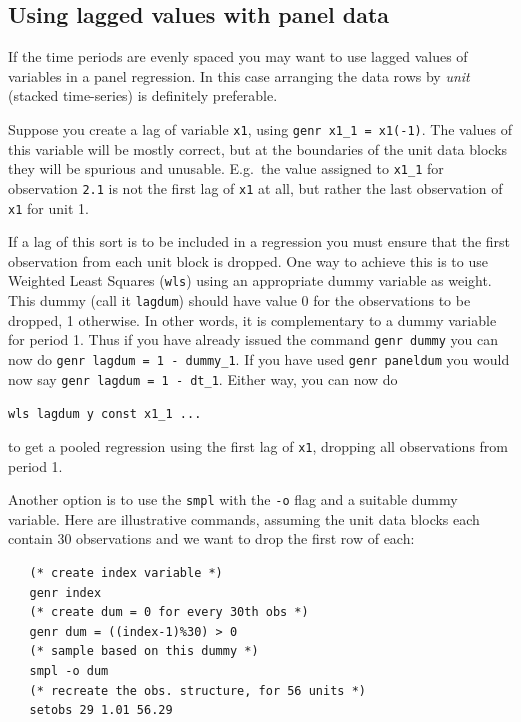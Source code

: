 \documentclass{article}
\begin{document}
\subsection{Using lagged values with panel data}

If the time periods are evenly spaced you may want to use lagged
values of variables in a panel regression.  In this case arranging the
data rows by \textit{unit} (stacked time-series) is definitely
preferable.

Suppose you create a lag of variable \texttt{x1}, using \texttt{genr
  x1\_1 = x1(-1)}.  The values of this variable will be mostly correct,
but at the boundaries of the unit data blocks they will be spurious
and unusable.  E.g.\ the value assigned to \texttt{x1\_1} for
observation \texttt{2.1} is not the first lag of \texttt{x1} at all,
but rather the last observation of \texttt{x1} for unit 1.

If a lag of this sort is to be included in a regression you must
ensure that the first observation from each unit block is dropped.
One way to achieve this is to use Weighted Least Squares
(\texttt{wls}) using an appropriate dummy variable as weight.  This
dummy (call it \texttt{lagdum}) should have value 0 for the
observations to be dropped, 1 otherwise.  In other words, it is
complementary to a dummy variable for period 1.  Thus if you have
already issued the command \texttt{genr dummy} you can now do
\texttt{genr lagdum = 1 - dummy\_1}.  If you have used \texttt{genr
  paneldum} you would now say \texttt{genr lagdum = 1 - dt\_1}.
Either way, you can now do

\begin{center}
  \texttt{wls lagdum y const x1\_1 ...}
\end{center}

\noindent to get a pooled regression using the first lag of
\texttt{x1}, dropping all observations from period 1.

Another option is to use the \texttt{smpl} with the \texttt{-o} flag
and a suitable dummy variable.  Here are illustrative commands,
assuming the unit data blocks each contain 30 observations and we want
to drop the first row of each:

\begin{verbatim}
   (* create index variable *)
   genr index
   (* create dum = 0 for every 30th obs *)
   genr dum = ((index-1)%30) > 0
   (* sample based on this dummy *)
   smpl -o dum
   (* recreate the obs. structure, for 56 units *)
   setobs 29 1.01 56.29
\end{verbatim}
\end{document}
